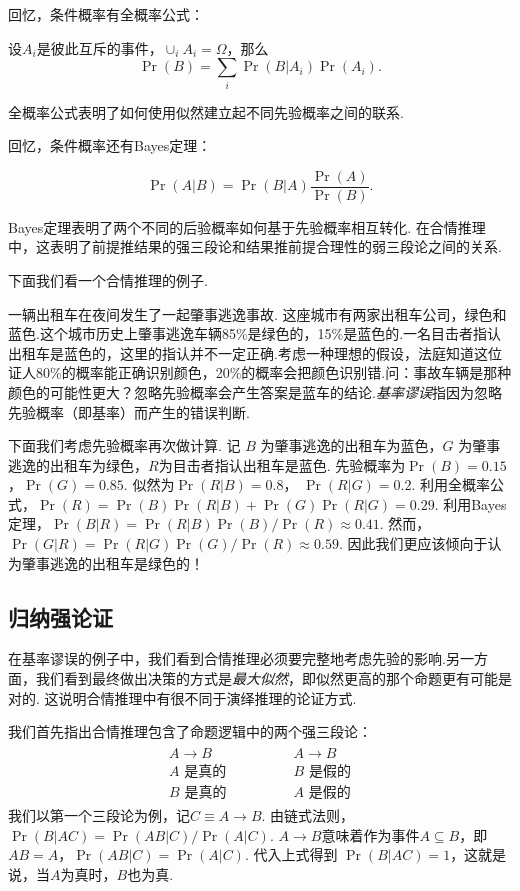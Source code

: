 回忆，条件概率有全概率公式：
\begin{theorem}[全概率公式]
设$A_i$是彼此互斥的事件，$\cup_i A_i=\Omega$，那么
    \[\Pr(B)=\sum_{i}\Pr(B|A_i)\Pr(A_i).\]
\end{theorem}
全概率公式表明了如何使用似然建立起不同先验概率之间的联系.

回忆，条件概率还有Bayes定理：
\begin{theorem}[Bayes定理]
    \[\Pr(A|B) = \Pr(B|A)\frac{\Pr(A)}{\Pr(B)}.\]
\end{theorem}
 Bayes定理表明了两个不同的后验概率如何基于先验概率相互转化. 在合情推理中，这表明了前提推结果的强三段论和结果推前提合理性的弱三段论之间的关系.

 下面我们看一个合情推理的例子. 

一辆出租车在夜间发生了一起肇事逃逸事故. 这座城市有两家出租车公司，绿色和蓝色.这个城市历史上肇事逃逸车辆85\%是绿色的，15\%是蓝色的.一名目击者指认出租车是蓝色的，这里的指认并不一定正确.考虑一种理想的假设，法庭知道这位证人80\%的概率能正确识别颜色，20\%的概率会把颜色识别错.问：事故车辆是那种颜色的可能性更大？忽略先验概率会产生答案是蓝车的结论.\emph{基率谬误}指因为忽略先验概率（即基率）而产生的错误判断.

下面我们考虑先验概率再次做计算. 记 $B$ 为肇事逃逸的出租车为蓝色，$G$ 为肇事逃逸的出租车为绿色，$R$为目击者指认出租车是蓝色. 先验概率为$\Pr(B) = 0.15$，$\Pr(G) = 0.85$. 似然为$\Pr(R|B) = 0.8$， $\Pr(R|G) = 0.2$. 利用全概率公式，$\Pr(R) = \Pr(B)\Pr(R|B) + \Pr(G)\Pr(R|G)  =0.29$. 利用Bayes定理，$\Pr(B|R) = \Pr(R|B){\Pr(B)}/{\Pr(R)}\approx 0.41$. 然而，$\Pr(G|R) = \Pr(R|G){\Pr(G)}/{\Pr(R)}\approx 0.59$. 因此我们更应该倾向于认为肇事逃逸的出租车是绿色的！


\subsection{归纳强论证}

在基率谬误的例子中，我们看到合情推理必须要完整地考虑先验的影响.另一方面，我们看到最终做出决策的方式是\emph{最大似然}，即似然更高的那个命题更有可能是对的. 这说明合情推理中有很不同于演绎推理的论证方式.

我们首先指出合情推理包含了命题逻辑中的两个强三段论：
        \[
        \begin{array}{c}
            \begin{array}{c}  
                A \to B \\ A\text{ 是真的} \\ \hline B\text{ 是真的}
            \end{array} 
            \qquad \qquad 
            \begin{array}{c}  
                A \to B \\ B\text{ 是假的} \\ \hline A\text{ 是假的}
            \end{array}
        \end{array} 
    \]
我们以第一个三段论为例，记$C \equiv A \to B$. 由链式法则，$\Pr(B|AC) = \Pr(AB|C) / \Pr(A|C)$. $A \to B$意味着作为事件$A\subseteq B$，即$AB=A$，$\Pr(AB|C) = \Pr(A|C)$. 代入上式得到 $\Pr(B|AC) = 1$，这就是说，当$A$为真时，$B$也为真.


